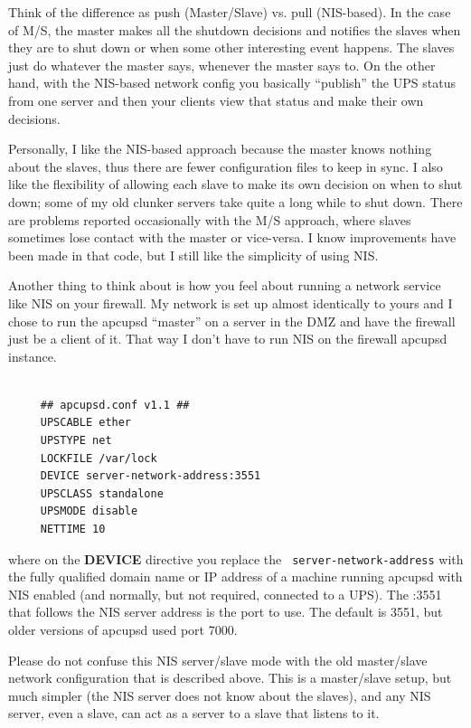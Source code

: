 Think of the difference as push (Master/Slave) vs. pull (NIS-based). In the
case of M/S, the master makes all the shutdown decisions and notifies the
slaves when they are to shut down or when some other interesting event
happens. The slaves just do whatever the master says, whenever the master says
to. On the other hand, with the NIS-based network config you basically
``publish'' the UPS status from one server and then your clients view that
status and make their own decisions.  

Personally, I like the NIS-based approach because the master knows nothing
about the slaves, thus there are fewer configuration files to keep in sync. I
also like the flexibility of allowing each slave to make its own decision on
when to shut down; some of my old clunker servers take quite a long while to
shut down. There are problems reported occasionally with the M/S approach,
where slaves sometimes lose contact with the master or vice-versa. I know
improvements have been made in that code, but I still like the simplicity of
using NIS.  

Another thing to think about is how you feel about running a network service
like NIS on your firewall. My network is set up almost identically to yours
and I chose to run the apcupsd ``master'' on a server in the DMZ and have the
firewall just be a client of it. That way I don't have to run NIS on the
firewall apcupsd instance. 

\footnotesize
\begin{verbatim}
     
     ## apcupsd.conf v1.1 ##
     UPSCABLE ether
     UPSTYPE net
     LOCKFILE /var/lock
     DEVICE server-network-address:3551
     UPSCLASS standalone
     UPSMODE disable
     NETTIME 10
\end{verbatim}
\normalsize

where on the {\bf DEVICE} directive you replace the {\tt
server-network-address} with the fully qualified domain name or IP address of
a machine running apcupsd with NIS enabled (and normally, but not required,
connected to a UPS). The :3551 that follows the NIS server address is the port
to use. The default is 3551, but older versions of apcupsd used port 7000.  

Please do not confuse this NIS server/slave mode with the old master/slave
network configuration that is described above.  This is a master/slave setup,
but much simpler (the NIS server does not know about the slaves), and any NIS
server, even a slave, can act as a server to a slave that listens to it.  

